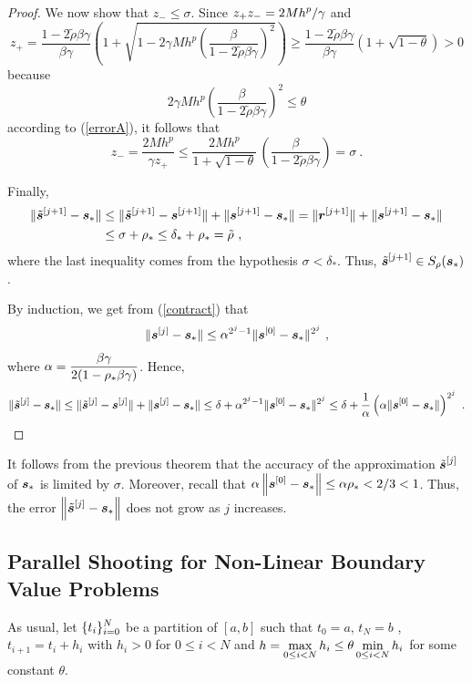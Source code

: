 \begin{proof}
We now show that $z_- \leq \sigma$.  Since
$\displaystyle z_+ z_- = 2Mh^p/\gamma$ and
\[
z_+ = \frac{1-2\tilde{\rho}\beta\gamma}{\beta \gamma}
\left( 1 + \sqrt{1 -
2\gamma M h^p\left(\frac{\beta}{1-2\tilde{\rho}\beta\gamma}\right)^2} \right)
\geq \frac{1-2\tilde{\rho}\beta\gamma}{\beta \gamma}
\left( 1 + \sqrt{1 - \theta}\right) > 0
\]
because
\[
  2\gamma M h^p\left(\frac{\beta}{1-2\tilde{\rho}\beta\gamma}\right)^2 \leq
\theta
\]
according to (\ref{errorA}), it follows that
\[
z_- = \frac{2Mh^p}{\gamma z_+} \leq \frac{2Mh^p}{1+\sqrt{1-\theta}} \,
\left( \frac{\beta}{1-2\tilde{\rho}\beta\gamma}\right) = \sigma \ .
\]

Finally,
\begin{align*}
\| \tilde{\bm{s}}^{[j+1]} - \bm{s}_\ast\|  &\leq
\| \tilde{\bm{s}}^{[j+1]} - \bm{s}^{[j+1]} \| +
\| \bm{s}^{[j+1]} - \bm{s}_\ast \|
= \| \bm{r}^{[j+1]} \| +
\| \bm{s}^{[j+1]} - \bm{s}_\ast \| \\
&\leq \sigma + \rho_\ast \leq \delta_\ast + \rho_\ast = \tilde{\rho} \ ,
\end{align*}
where the last inequality comes from the
hypothesis $\sigma < \delta_\ast$.  Thus,
$\displaystyle \tilde{\bm{s}}^{[j+1]} \in S_{\rho}(\bm{s}_\ast)$.

 By induction, we get from (\ref{contract}) that
\[
  \| \bm{s}^{[j]} - \bm{s}_\ast \| \leq
  \alpha^{2^j-1}\|\bm{s}^{[0]}- \bm{s}_\ast\|^{2^j} \ ,
\]
where
$\displaystyle \alpha = \frac{\beta\gamma}{2(1-\rho_\ast \beta\gamma)}$.
Hence,
\[
\| \tilde{\VEC{s}}^{[j]} - \VEC{s}_\ast \| \leq
\| \tilde{\VEC{s}}^{[j]} - \VEC{s}^{[j]} \| +
\| \VEC{s}^{[j]} - \VEC{s}_\ast \|
\leq \delta + \alpha^{2^j-1} \| \VEC{s}^{[0]} - \VEC{s}_\ast \|^{2^j}
\leq \delta + \frac{1}{\alpha}
\left( \alpha \| \VEC{s}^{[0]}-\VEC{s}_\ast  \| \right)^{2^j} \ .  \qedhere
\]
\end{proof}

It follows from the previous theorem that the accuracy of the
approximation $\displaystyle \tilde{\bm{s}}^{[j]}$ of $\bm{s}_\ast$
is limited by $\sigma$.  Moreover, recall that
$\displaystyle \alpha \left\|\bm{s}^{[0]} - \bm{s}_\ast\right\|
\leq \alpha \rho_\ast < 2/3 < 1$.  Thus, the error
$\displaystyle \left\| \tilde{\bm{s}}^{[j]} - \bm{s}_\ast \right\|$
does not grow as $j$ increases.

\subsection{Parallel Shooting for Non-Linear Boundary Value Problems}

As usual, let $\displaystyle \{t_i\}_{i=0}^N$ be a partition of
$[a,b]$ such that $t_0 = a$, $t_N = b$ , $t_{i+1} = t_i + h_i$ with $h_i > 0$
for $0\leq i < N$ and
$\displaystyle h = \max_{0\leq i < N} h_i \leq \theta \min_{0\leq i < N} h_i$
for some constant $\theta$.

